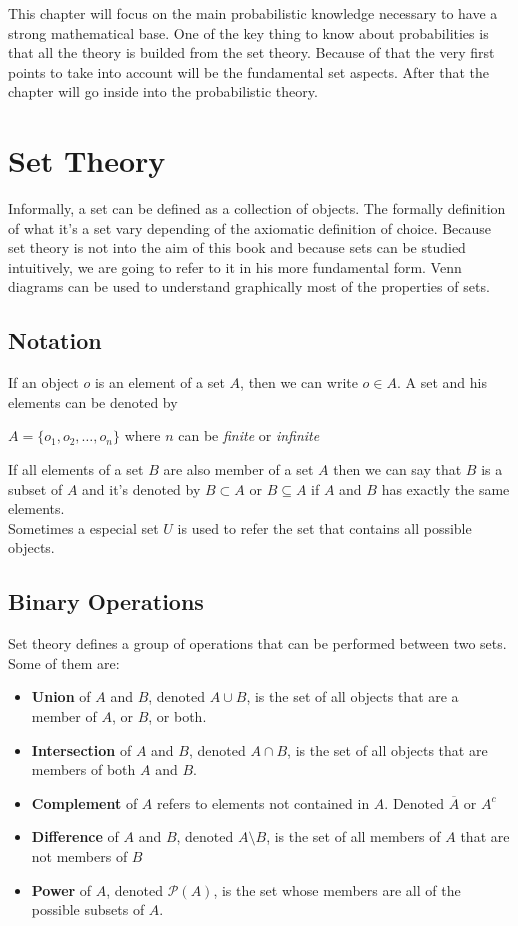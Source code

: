 This chapter will focus on the main probabilistic knowledge necessary to have a strong mathematical base. One of the key thing to know about
probabilities is that all the theory is builded from the set theory. Because of that the very first points to take into account will be the
fundamental set aspects. After that the chapter will go inside into the probabilistic theory.

\section{Set Theory}
Informally, a set can be defined as a collection of objects. The formally definition of what it's a set vary depending of the axiomatic definition
of choice. Because set theory is not into the aim of this book and because sets can be studied intuitively, we are going to refer to it in his more 
fundamental form. Venn diagrams can be used to understand graphically most of the properties of sets.

\subsection{Notation}
If an object $o$ is an element of a set $A$, then we can write $o \in A$. A set and his elements can be denoted by
\begin{center}
    $A = \{o_1, o_2, \dots , o_n\}$ where $n$ can be \textit{finite} or \textit{infinite}
\end{center}
If all elements of a set $B$ are also member of a set $A$ then we can say that $B$ is a subset of $A$ and it's denoted by $B \subset A$ or $B \subseteq A$ 
if $A$ and $B$ has exactly the same elements.\\
Sometimes a especial set $U$ is used to refer the set that contains all possible objects.

\subsection{Binary Operations}
Set theory defines a group of operations that can be performed between two sets. Some of them are:
\begin{itemize}
    \item \textbf{Union} of $A$ and $B$, denoted $A \cup B$, is the set of all objects that are a member of $A$, or $B$, or both.
    \item \textbf{Intersection} of $A$ and $B$, denoted $A \cap B$, is the set of all objects that are members of both $A$ and $B$.
    \item \textbf{Complement} of $A$ refers to elements not contained in $A$. Denoted $\overline{A}$ or $A^c$
    \item \textbf{Difference} of $A$ and $B$, denoted $A \setminus B$, is the set of all members of $A$ that are not members of $B$
    \item \textbf{Power} of $A$, denoted $\mathcal{P}(A)$, is the set whose members are all of the possible subsets of $A$. 
\end{itemize}

